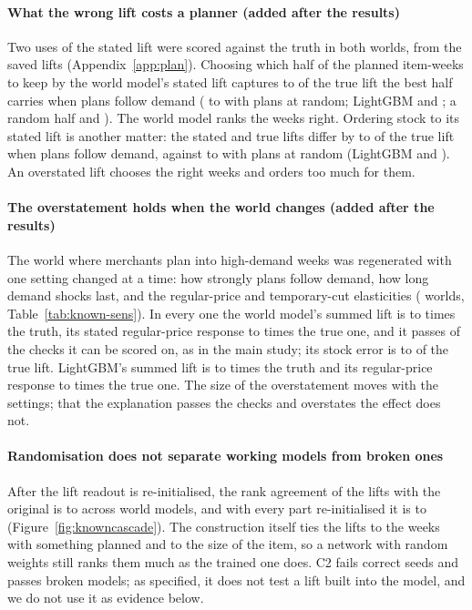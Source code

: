 \paragraph{What the wrong lift costs a planner (added after the results)}
Two uses of the stated lift were scored against the truth in both worlds, from the saved lifts
(Appendix~\ref{app:plan}). Choosing which half of the planned item-weeks to keep by the
world model's stated lift captures \kdCoWmChoiceLo{} to \kdCoWmChoiceHi{} of the true lift the best
half carries when plans follow demand (\kdClWmChoiceLo{} to \kdClWmChoiceHi{} with plans at random;
LightGBM \kdCoLgbChoice{} and \kdClLgbChoice; a random half \kdCoRandom{} and \kdClRandom). The world
model ranks the weeks right. Ordering stock to its stated lift is another matter: the stated and true
lifts differ by \kdCoWmStockLo{} to \kdCoWmStockHi{} of the true lift when plans follow demand, against
\kdClWmStockLo{} to \kdClWmStockHi{} with plans at random (LightGBM \kdCoLgbStock{} and
\kdClLgbStock). An overstated lift chooses the right weeks and orders too much for them.

\paragraph{The overstatement holds when the world changes (added after the results)}
The world where merchants plan into high-demand weeks was regenerated with one setting changed at a
time: how strongly plans follow demand, how long demand shocks last, and the regular-price and
temporary-cut elasticities (\ksN{} worlds, Table~\ref{tab:known-sens}). In every one the world
model's summed lift is \ksWmBiasLo{} to \ksWmBiasHi{} times the truth, its stated regular-price
response \ksWmRegLo{} to \ksWmRegHi{} times the true one, and it passes \ksWmPassedHi{} of the
\ksWmApplicable{} checks it can be scored on, as in the main study; its stock error is
\ksWmStockLo{} to \ksWmStockHi{} of the true lift. LightGBM's summed lift is \ksLgbBiasLo{} to
\ksLgbBiasHi{} times the truth and its regular-price response \ksLgbRegLo{} to \ksLgbRegHi{} times the
true one. The size of the overstatement moves with the settings; that the explanation passes the
checks and overstates the effect does not.



\paragraph{Randomisation does not separate working models from broken ones}
After the lift readout is re-initialised, the rank agreement of the lifts with
the original is \kaLiftReadLo{} to \kaLiftReadHi{} across world models, and with
every part re-initialised it is \kaEncLo{} to \kaEncHi{}
(Figure~\ref{fig:knowncascade}). The construction itself ties the lifts to the
weeks with something planned and to the size of the item, so a network with
random weights still ranks them much as the trained one does. C2 fails correct
seeds and passes broken models; as specified, it does not test a lift built
into the model, and we do not use it as evidence below.

